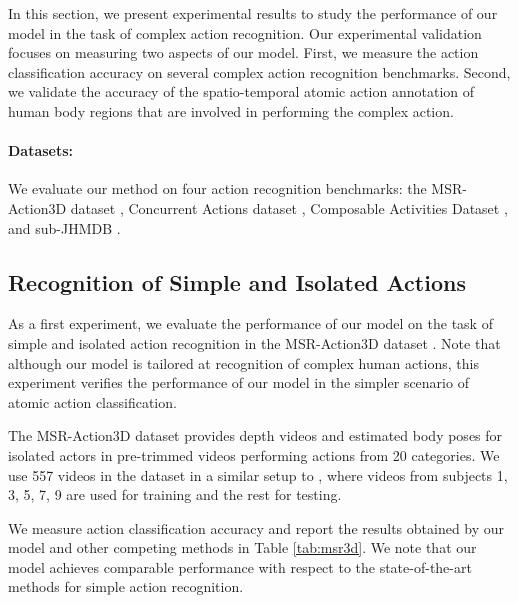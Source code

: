 In this section, we present experimental results to study the performance
of our model in the task of complex action recognition. Our experimental
validation focuses on measuring two aspects of our model.
First, we measure the action classification accuracy on
several complex action recognition benchmarks.
Second, we validate the accuracy of the spatio-temporal atomic action
annotation of human body regions that are involved in performing the complex
action.


\paragraph{Datasets:}
We evaluate our method on four action recognition benchmarks:
the MSR-Action3D dataset \cite{WanLi2010},
Concurrent Actions dataset \cite{Wei2013},
Composable Activities Dataset \cite{Lillo2014}, and sub-JHMDB
\cite{Jhuang2013}.


\subsection{Recognition of Simple and Isolated Actions}

As a first experiment,
we evaluate the performance of our model on the task of simple and
isolated action recognition in the  MSR-Action3D dataset \cite{WanLi2010}.
Note that although our model is tailored at recognition of complex human
actions, this experiment verifies the performance of our model in the
simpler scenario of atomic action classification.

The MSR-Action3D dataset provides depth videos and estimated body poses
for isolated actors in pre-trimmed videos performing actions from 20
categories. We use 557 videos in the dataset in a similar setup to
\cite{Wang2012}, where videos from subjects 1, 3, 5, 7, 9 are used for
training and the rest for testing.

We measure action classification accuracy and report the results obtained
by our model and other competing methods in Table \ref{tab:msr3d}.
We note that our model achieves comparable performance with respect
to the state-of-the-art methods for simple action recognition.

